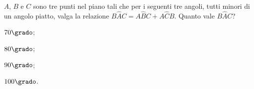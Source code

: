\begin{esercizio}  %
\label{ese:3.21}
$A$, $B$ e $C$ sono tre punti nel piano tali che per i seguenti tre 
angoli, tutti minori di un angolo piatto, valga la relazione 
$B\widehat{A}C=A\widehat{B}C+A\widehat{C}B$. Quanto vale 
$B\widehat{A}C$?
\begin{multicols}{4}
\begin{enumeratea}
\item $70\grado$;
\item $80\grado$;
\item $90\grado$;
\item $100\grado$.
\end{enumeratea}
\end{multicols}
\end{esercizio}

